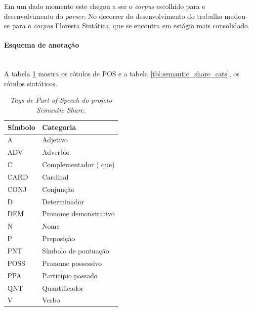 Em um dado momento este chegou a ser o \emph{corpus} escolhido para o desenvolvimento do \emph{parser}. No decorrer do desenvolvimento do trabalho mudou-se para o \emph{corpus} Floresta Sintática, que se encontra em estágio mais consolidado.

\paragraph{Esquema de anotação}\label{sub:semantic_anotacao}\hspace*{1in}\\

A tabela \ref{tbl:semantic_share_pos} mostra os rótulos de POS e a tabela \ref{tbl:semantic_share_cats}, os rótulos sintáticos.

\begin{table}

   \centering
   \small
   \caption{\it Tags de \emph{Part-of-Speech} do projeto Semantic Share.}

    \begin{tabular}{ | p{3cm} | p{10cm} | }
      \hline
        \textbf{Símbolo} & \textbf{Categoria}\\
        \hline
        \hline

    A&Adjetivo\\
    \hline
    ADV&Adverbio\\
    \hline
    C&Complementador ( que)\\
    \hline
    CARD&Cardinal\\
    \hline
    CONJ&Conjunção\\
    \hline
    D&Determinador\\
    \hline
    DEM&Pronome demonstrativo\\
    \hline
    N&Nome\\
    \hline
    P&Preposição\\
    \hline
    PNT&Símbolo de pontuação\\
    \hline
    POSS&Pronome possessivo\\
    \hline
    PPA&Particípio passado\\
    \hline
    QNT& Quantificador\\
    \hline
    V& Verbo\\
    \hline


   \end{tabular}
\label{tbl:semantic_share_pos}      
\end{table}



